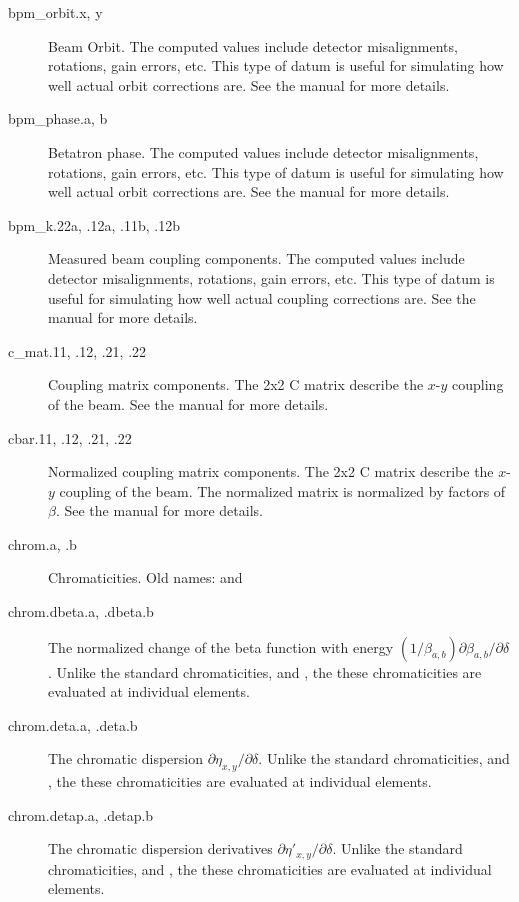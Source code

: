 \begin{description}
  \item[bpm_orbit.x, y] \Newline
Beam Orbit. The computed  values include detector misalignments, rotations, gain
errors, etc. This type of datum is useful for simulating how well actual orbit corrections
are. See the \bmad manual for more details.

  \item[bpm_phase.a, b] \Newline
Betatron phase. The computed  values include detector misalignments, rotations, gain
errors, etc. This type of datum is useful for simulating how well actual orbit corrections
are. See the \bmad manual for more details.

  \item[bpm_k.22a, .12a, .11b, .12b] \Newline
Measured beam coupling components. The computed  values include detector misalignments, rotations, gain
errors, etc. This type of datum is useful for simulating how well actual coupling corrections
are. See the \bmad manual for more details.

  \item[c_mat.11, .12, .21, .22] \Newline
Coupling matrix components. The 2x2 C matrix describe the $x$-$y$ coupling of the beam.
See the \bmad manual for more details.

  \item[cbar.11, .12, .21, .22] \Newline
Normalized coupling matrix components. The 2x2 C matrix describe the $x$-$y$ coupling of the beam.
The normalized matrix is normalized by factors of $\beta$. See the \bmad manual for more details.

  \item[chrom.a, .b] \Newline
Chromaticities. Old names:  and 

  \item[chrom.dbeta.a, .dbeta.b] \Newline
The normalized change of the beta function with energy
$(1/\beta_{a,b})\partial\beta_{a,b}/\partial\delta$. Unlike the standard chromaticities, and ,
the these chromaticities are evaluated at individual elements.

  \item[chrom.deta.a, .deta.b] \Newline
The chromatic dispersion $\partial\eta_{x,y}/\partial\delta$. Unlike the standard
chromaticities, and , the these chromaticities are evaluated at
individual elements.

  \item[chrom.detap.a, .detap.b] \Newline
The chromatic dispersion derivatives $\partial\eta'_{x,y}/\partial\delta$. Unlike the standard
chromaticities, and , the these chromaticities are evaluated at
individual elements.


\end{description}
